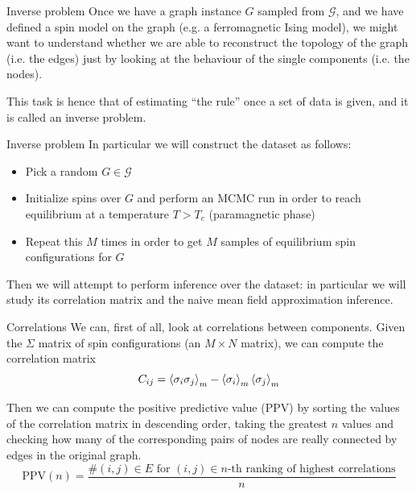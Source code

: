 \documentclass[handout]{beamer}
\begin{document}
\begin{frame}{Inverse problem}
    Once we have a graph instance $G$ sampled from $\mathcal{G}$, and we have
    defined a spin model on the graph (e.g. a ferromagnetic Ising model), we
    might want to understand whether we are able to \alert{reconstruct} the
    topology of the graph (i.e. the edges) just by looking at the behaviour of
    the single components (i.e. the nodes).
    
    This task is hence that of estimating ``the rule'' once a set of data is
    given, and it is called an \alert{inverse problem}.
\end{frame}

\begin{frame}{Inverse problem}
    In particular we will construct the dataset as follows:
    \begin{itemize}
        \item Pick a random $G \in \mathcal{G}$
        \item Initialize spins over $G$ and perform an MCMC run in order to
            reach equilibrium at a temperature $T > T_c$ (\alert{paramagnetic}
            phase)
        \item Repeat this $M$ times in order to get $M$ samples of equilibrium
            spin configurations for $G$
    \end{itemize}

    Then we will attempt to perform inference over the dataset: in particular we
    will study its \alert{correlation matrix} and the \alert{naive mean field
    approximation inference}.
\end{frame}

\begin{frame}{Correlations}
    We can, first of all, look at correlations between components. Given the
    $\Sigma$ matrix of spin configurations (an $M \times N$ matrix), we can
    compute the \alert{correlation matrix}
    \begin{equation}
        C_{ij} = \expval{\sigma_i \sigma_j}_m - \expval{\sigma_i}_m
        \expval{\sigma_j}_m
    \end{equation}

    Then we can compute the \alert{positive predictive value} (PPV) by sorting
    the values of the correlation matrix in descending order, taking the
    greatest $n$ values and checking how many of the corresponding pairs of
    nodes are really connected by edges in the original graph.
    \begin{equation}
        \text{PPV}(n) = \frac{\#(i, j) \in E\text{ for }(i, j) \in n\text{-th
        ranking of highest correlations}}{n}
    \end{equation}
\end{frame}
\end{document}

